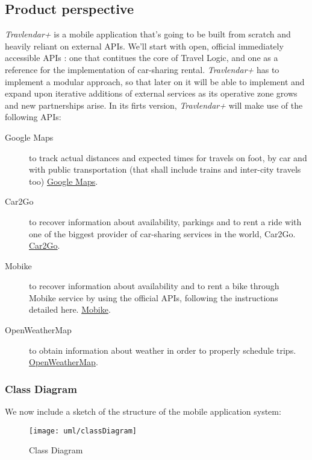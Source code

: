 \subsection{Product perspective}

	\textit{Travlendar+} is a mobile application that’s going to be built from scratch and heavily reliant on external APIs. We’ll start with open, official immediately accessible APIs : one that contitues the core of Travel Logic, and one as a reference for the implementation of car-sharing rental.
	\textit{Travlendar+} has to implement a modular approach, so that later on it will be able to implement and expand upon iterative additions of external services as its operative zone grows and new partnerships arise. In its firts version, \textit{Travlendar+} will make use of the following APIs:
		
		\begin{description}
			\item[Google Maps] to track actual distances and expected times for travels on foot, by car and with public transportation (that shall include trains and inter-city travels too) 
				\href{https://developers.google.com/maps/}{Google Maps}.
			
			\item[Car2Go] to recover information about availability, parkings and to rent a ride with one of the biggest provider of car-sharing services in the world, Car2Go.
				\href{https://github.com/car2go/openAPI}{Car2Go}.
	
			\item[Mobike] to recover information about availability and to rent a bike through Mobike service by using the official APIs, following the instructions detailed here.
				\href{https://github.com/ubahnverleih/WoBike}{Mobike}.
			
			\item[OpenWeatherMap] to obtain information about weather in order to properly schedule trips.
				\href{http://openweathermap.org/api}{OpenWeatherMap}.

		\end{description}

	\newpage
	\subsubsection{Class Diagram}
		We now include a sketch of the structure of the mobile application system:
				
			\begin{figure}[H]
				\centering
				\texttt{[image: uml/classDiagram]}
				\caption{Class Diagram}
			\end{figure}

